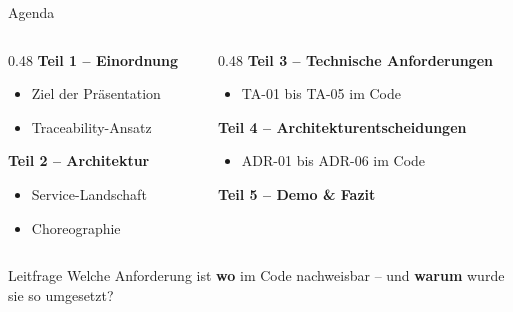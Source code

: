 
\begin{frame}{Agenda}
  \begin{columns}[T,onlytextwidth]
    \begin{column}{0.48\textwidth}
      \textbf{Teil 1 -- Einordnung}
      \begin{itemize}
        \item Ziel der Präsentation
        \item Traceability-Ansatz
      \end{itemize}
      \vspace{0.4cm}
      \textbf{Teil 2 -- Architektur}
      \begin{itemize}
        \item Service-Landschaft
        \item Choreographie
      \end{itemize}
    \end{column}
    \begin{column}{0.48\textwidth}
      \textbf{Teil 3 -- Technische Anforderungen}
      \begin{itemize}
        \item TA-01 bis TA-05 im Code
      \end{itemize}
      \vspace{0.4cm}
      \textbf{Teil 4 -- Architekturentscheidungen}
      \begin{itemize}
        \item ADR-01 bis ADR-06 im Code
      \end{itemize}
      \vspace{0.4cm}
      \textbf{Teil 5 -- Demo \& Fazit}
    \end{column}
  \end{columns}

  \vfill
  \begin{block}{Leitfrage}
    \small Welche Anforderung ist \textbf{wo} im Code nachweisbar -- und
    \textbf{warum} wurde sie so umgesetzt?
  \end{block}
\end{frame}

